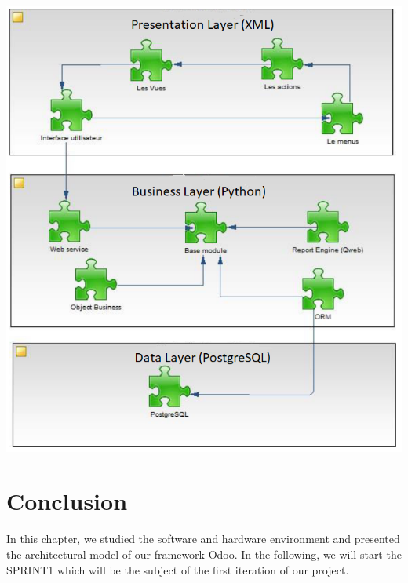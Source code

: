            \begin{center}
         \includegraphics[scale=0.70]{img/logical_arch.png}\\
       \end{center}
\section*{Conclusion}
In this chapter, we studied the software and hardware environment and presented the architectural model of our framework Odoo. 
In the following, we will start the SPRINT1 which will be the subject of the first iteration of our project.